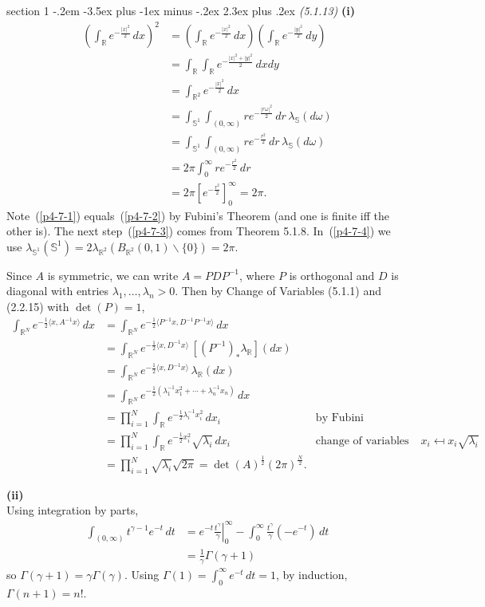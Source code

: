 \documentclass[12pt]{article}
\makeatletter
\theoremstyle{norm}
\newcommand{\bS}[0]{\mathbb{S}}
\newcommand{\R}[0]{\mathbb{R}}
\newcommand{\rc}[1]{\frac{1}{#1}}
\newcommand{\ga}[0]{\gamma}
\newcommand{\Ga}[0]{\Gamma}
\newcommand{\la}[0]{\lambda}
\newcommand{\om}[0]{\omega}
\newcommand{\pa}[1]{\left( {#1} \right)}
\newcommand{\an}[1]{\langle {#1}\rangle}
\newcommand{\subprob}[1]{\noindent\textbf{#1}\\}
\newcommand{\bs}[0]{\backslash}
\newcommand{\iy}[0]{\infty}
\newenvironment{problem}{\@startsection
       {section}
       {1}
       {-.2em}
       {-3.5ex plus -1ex minus -.2ex}
       {2.3ex plus .2ex}
       {\pagebreak[3]%
       \large\bf\noindent{Problem }
       }
       }
       {%
       }
\makeatother
\begin{document}
\begin{problem}{\it (5.1.13)}
\subprob{(i)}
\begin{align}
\nonumber
\pa{\int_{\R} e^{-\frac{|x|^2}{2}}\,dx}^2
&=\pa{\int_{\R} e^{-\frac{|x|^2}{2}}\,dx}
\pa{\int_{\R} e^{-\frac{|y|^2}{2}}\,dy}\\
\label{p4-7-1}
&=\int_{\R}\int_{\R}e^{-\frac{|x|^2+|y|^2}{2}}\,dxdy\\
\label{p4-7-2}
&=\int_{\R^2} e^{-\frac{|x|^2}{2}}\,dx\\
\label{p4-7-3}
&=\int_{\bS^1}\int_{(0,\iy)} re^{-\frac{|r\om|^2}{2}}\,dr\,\la_{\bS}(d\om)\\
\nonumber
&=\int_{\bS^1}  \int_{(0,\iy)} re^{-\frac{r^2}{2}}\,dr \,\la_{\bS}(d\om)\\
\label{p4-7-4}
&=2\pi\int_0^{\iy} re^{-\frac{r^2}{2}}\,dr\\
\nonumber
&=2\pi[e^{-\frac{r^2}{2}}]^{\iy}_0=2\pi.
\end{align}
Note~(\ref{p4-7-1}) equals~(\ref{p4-7-2}) by Fubini's Theorem (and one is finite iff the other is). The next step~(\ref{p4-7-3}) comes from  Theorem 5.1.8. In~(\ref{p4-7-4}) we use $\la_{\bS^1}(\bS^1)=2\la_{\R^2}(B_{\R^2}(0,1)\bs \{0\})=2\pi$.

Since $A$ is symmetric, we can write $A=PDP^{-1}$, where $P$ is orthogonal and $D$ is diagonal with entries $\la_1,\ldots, \la_n>0$. Then by Change of Variables (5.1.1) and (2.2.15) with $\det(P)=1$,
\begin{align*}
\int_{\R^N}e^{-\rc{2}\an{x,A^{-1}x}}\,dx
&=\int_{\R^N}e^{-\rc{2}\an{P^{-1}x,D^{-1}P^{-1}x}}\,dx\\
&=\int_{\R^N}e^{-\rc{2}\an{x,D^{-1}x}}\,[(P^{-1})_*\la_{\R}](dx)\\
&=\int_{\R^N}e^{-\rc{2}\an{x,D^{-1}x}}\,\la_{\R}(dx)\\
&=\int_{\R^N}e^{-\rc{2}(\la_1^{-1}x_1^2+\cdots+\la_n^{-1}x_n)}\,dx\\
&=\prod_{i=1}^N\int_{\R} e^{-\rc2\la_i^{-1}x_i^2}\,dx_i&\text{by Fubini}\\
&=\prod_{i=1}^N\int_{\R}e^{-\rc2x_i^2} \sqrt{\la_i}\,dx_i&\text{change of variables (5.1.1), }x_i\mapsfrom x_i\sqrt{\la_i}\\
&=\prod_{i=1}^N \sqrt{\la_i}\sqrt{2\pi}=\det(A)^{\rc2}(2\pi)^{\frac N2}.
\end{align*}

\subprob{(ii)}
Using integration by parts,
\begin{align*}
\int_{(0,\iy)} t^{\ga-1}e^{-t}\,dt
&=\left.e^{-t}\frac{t^{\ga}}{\ga}\right|^{\infty}_0-\int_0^{\iy} \frac{t^{\ga}}{\ga}(-e^{-t})\,dt\\
&=\rc{\ga}\Ga(\ga+1)
\end{align*}
so $\Ga(\ga+1)=\ga\Ga(\ga)$. Using $\Ga(1)=\int_0^{\iy} e^{-t}\,dt=1$, by induction, $\Ga(n+1)=n!$.


\end{problem}
\end{document}
